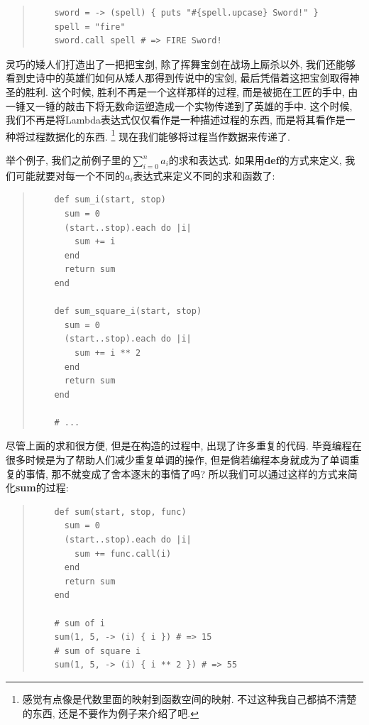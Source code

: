 \begin{quotation}
  \begin{verbatim}
    sword = -> (spell) { puts "#{spell.upcase} Sword!" }
    spell = "fire"
    sword.call spell # => FIRE Sword!
  \end{verbatim}
\end{quotation}

灵巧的矮人们打造出了一把把宝剑, 除了挥舞宝剑在战场上厮杀以外, 我们还能够看到史诗中的英雄们如何从矮人那得到传说中的宝剑, 最后凭借着这把宝剑取得神圣的胜利. 这个时候, 胜利不再是一个这样那样的过程, 而是被扼在工匠的手中, 由一锤又一锤的敲击下将无数命运塑造成一个实物传递到了英雄的手中. 这个时候, 我们不再是将Lambda表达式仅仅看作是一种描述过程的东西, 而是将其看作是一种将过程数据化的东西. \footnote{感觉有点像是代数里面的映射到函数空间的映射. 不过这种我自己都搞不清楚的东西, 还是不要作为例子来介绍了吧. } 现在我们能够将过程当作数据来传递了. 

举个例子, 我们之前例子里的$\sum_{i=0}^n a_i$的求和表达式. 如果用\textbf{def}的方式来定义, 我们可能就要对每一个不同的$a_i$表达式来定义不同的求和函数了: 

\begin{quotation}
  \begin{verbatim}
    def sum_i(start, stop)
      sum = 0
      (start..stop).each do |i|
        sum += i
      end
      return sum
    end

    def sum_square_i(start, stop)
      sum = 0
      (start..stop).each do |i|
        sum += i ** 2
      end
      return sum
    end

    # ...
  \end{verbatim}
\end{quotation}

尽管上面的求和很方便, 但是在构造的过程中, 出现了许多重复的代码. 毕竟编程在很多时候是为了帮助人们减少重复单调的操作, 但是倘若编程本身就成为了单调重复的事情, 那不就变成了舍本逐末的事情了吗? 所以我们可以通过这样的方式来简化\textbf{sum}的过程: 

\begin{quotation}
  \begin{verbatim}
    def sum(start, stop, func)
      sum = 0
      (start..stop).each do |i|
        sum += func.call(i)
      end
      return sum
    end

    # sum of i
    sum(1, 5, -> (i) { i }) # => 15
    # sum of square i
    sum(1, 5, -> (i) { i ** 2 }) # => 55
  \end{verbatim}
\end{quotation}

